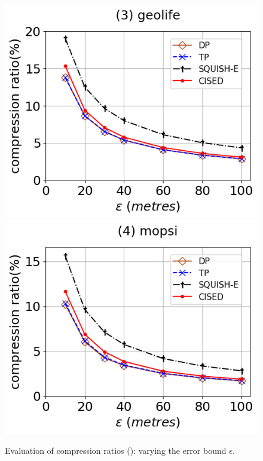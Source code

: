 \begin{figure}[tb!]
	\includegraphics[scale=0.315]{Figures/Exp-SED-CR-epsilon-geolife.png}	\hspace{1ex}
	\includegraphics[scale=0.315]{Figures/Exp-SED-CR-epsilon-mopsi.png}		
	\vspace{-2.5ex}
	\caption{\small Evaluation of compression ratios (\sed): varying the error bound $\epsilon$.}
	\label{fig:cr-sed-epsilon}
	\vspace{-2ex}
\end{figure}

